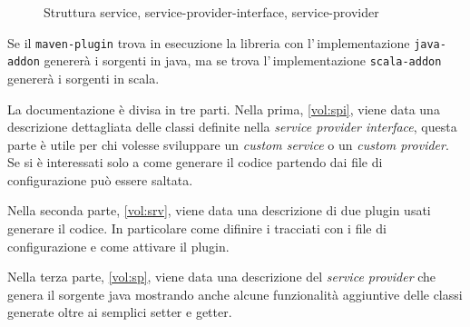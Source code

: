 \begin{figure}[!htb]
\centering
{}
\caption{Struttura service, service-provider-interface, service-provider} 
\label{fig:spi}
\end{figure}

Se il \verb!maven-plugin! trova in esecuzione la libreria con 
l'\,implementazione \verb!java-addon! genererà i sorgenti in java, ma se trova
l'\,implementazione \verb!scala-addon! genererà i sorgenti in scala.

La documentazione è divisa in tre parti. Nella prima, \ref{vol:spi}, viene data 
una descrizione dettagliata delle classi definite nella 
\textsl{service provider interface}, questa parte è utile per chi volesse 
sviluppare un \textit{custom service} o un \textit{custom provider}. 
Se si è interessati solo a come generare il codice partendo dai file di 
configurazione può essere saltata.

Nella seconda parte, \ref{vol:srv}, viene data una descrizione di due plugin 
usati generare il codice.
In particolare come difinire i tracciati con i file di configurazione e come 
attivare il plugin.

Nella terza parte, \ref{vol:sp}, viene data una descrizione del \textsl{service 
provider} che genera il sorgente java mostrando anche alcune funzionalità 
aggiuntive delle classi generate oltre ai semplici setter e getter.
